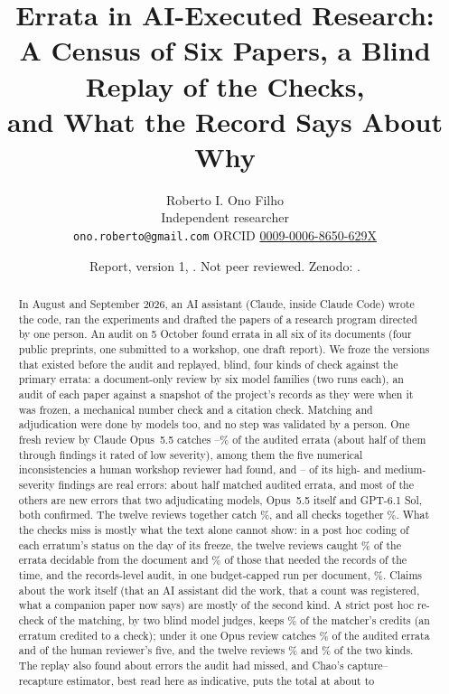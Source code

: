 \documentclass[11pt]{article}
\title{Errata in AI-Executed Research:\\ A Census of Six Papers, a Blind Replay of the Checks,\\ and What the Record Says About Why}
\author{Roberto I. Ono Filho\\ Independent researcher\\
\texttt{ono.roberto@gmail.com} \quad ORCID \href{https://orcid.org/0009-0006-8650-629X}{0009-0006-8650-629X}}
\date{\small Report, version 1, \reportdate. Not peer reviewed. Zenodo: \thisdoi.}
\begin{document}
\maketitle

\begin{abstract}
In August and September 2026, an AI assistant (Claude, inside Claude Code) wrote the code, ran the experiments and drafted the
papers of a research program directed by one person. An audit on 5 October found errata in all six of its documents (four
public preprints, one submitted to a workshop, one draft report). We
froze the versions that existed before the audit and replayed, blind, four kinds of check against the \NrefPrimary{} primary
errata: a document-only review by six model families (two runs each), an audit of each paper against a snapshot of the project's
records as they were when it was frozen, a mechanical number check and a citation check. Matching and adjudication were done
by models too, and no step was validated by a person. One fresh review by Claude Opus~5.5
catches \RecOpusAPct--\RecOpusBPct\% of the audited errata (about half of them through findings it rated of low severity),
among them the five numerical inconsistencies a human workshop reviewer had found, and \PrecOpusA--\PrecOpusB{} of its high- and
medium-severity findings are real errors: about half matched audited errata, and most of the others are new errors that two
adjudicating models, Opus~5.5 itself and GPT-6.1 Sol, both confirmed. The twelve reviews together catch \RecConeAllPct\%, and all checks together \RecAllPct\%. What the checks miss is mostly what the text alone cannot
show: in a post hoc coding of each erratum's status on the day of its freeze, the twelve reviews caught \RecConeDocPct\% of the
errata decidable from the document and \RecConeRecPct\% of those that needed the records of the time, and the records-level audit,
in one budget-capped run per document, \RecCtwoRecPct\%. Claims about the work itself (that an AI assistant did the work, that a
count was registered, what a companion paper now says) are mostly of the second kind. A strict post hoc re-check of the matching,
by two blind model judges, keeps \StrictKeptPct\% of the matcher's credits (an erratum credited to a check); under it one Opus
review catches \StrictRecOpusRange\% of the audited errata and \StrictJudgeOpusA{} of the human reviewer's five, and the twelve
reviews \StrictRecConeDocPct\% and \StrictRecConeRecPct\% of the two kinds. The replay also found about \NnewDedup{} errors the
audit had missed, and Chao's capture--recapture estimator, best read here as indicative, puts the total at about \ChaoDedupN{} to

\end{abstract}
\end{document}
